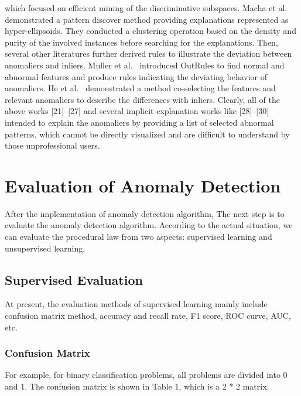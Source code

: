 which focused on efficient mining of the discriminative subspaces. 
Macha et al.~\cite{macha2018explaining} 
demonstrated a pattern discover method providing explanations represented as hyper-ellipsoids. 
They conducted a clustering operation based on the density and 
purity of the involved instances before searching for the explanations. 
Then, 
several other literatures further derived rules to 
illustrate the deviation between anomaliers and 
inliers. 
Muller et al.~\cite{muller2012outrules} 
introduced OutRules to 
find normal and abnormal features and 
produce rules indicating the deviating behavior of anomaliers. 
He et al.~\cite{he2010co} 
demonstrated a method co-selecting the features and 
relevant anomaliers to 
describe the differences with inliers. 
Clearly, 
all of the above works [21]–[27] and 
several implicit explanation works like [28]–[30] intended to 
explain the anomaliers by providing a list of selected abnormal patterns, 
which cannot be directly visualized and 
are difficult to understand 
by those unprofessional users.




\section{Evaluation of Anomaly Detection}

After the implementation of anomaly 
detection algorithm,
The next step is to evaluate the 
anomaly detection algorithm.
According to the actual situation, 
we can evaluate the procedural law 
from two aspects: supervised learning 
and unsupervised learning.

\subsection{Supervised Evaluation}
At present, 
the evaluation methods of supervised learning mainly
include confusion matrix method, accuracy and recall rate,
F1 score,
ROC curve,
AUC,
etc.

\subsubsection{Confusion Matrix}
For example,
for binary classification problems,
all problems are divided into 0 and 1.
The confusion matrix is shown in Table 1,
which is a 2 * 2 matrix.

